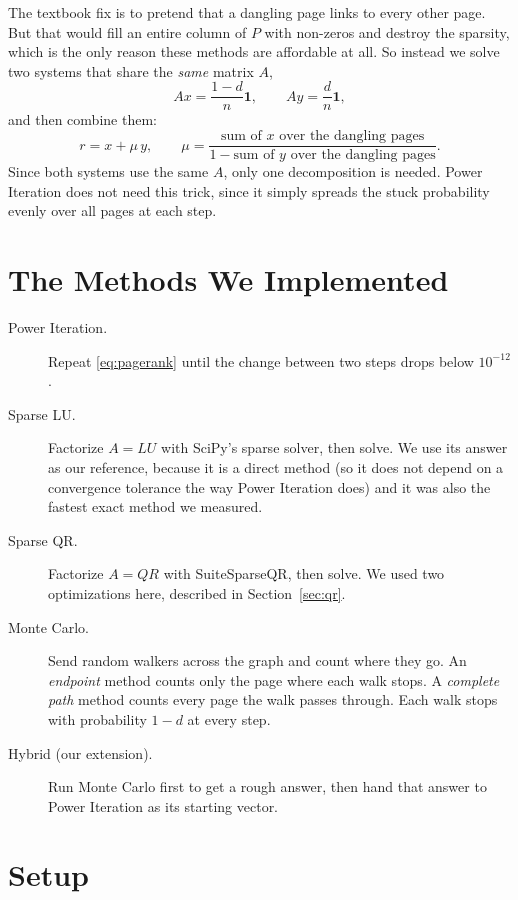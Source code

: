 \documentclass[11pt,a4paper]{article}
\begin{document}
The textbook fix is to pretend that a dangling page links to every other page. But
that would fill an entire column of $P$ with non-zeros and destroy the sparsity, which
is the only reason these methods are affordable at all. So instead we solve two
systems that share the \emph{same} matrix $A$,
\[
  A x = \frac{1-d}{n}\mathbf{1},
  \qquad
  A y = \frac{d}{n}\mathbf{1},
\]
and then combine them:
\begin{equation}
  r = x + \mu\, y,
  \qquad
  \mu = \frac{\text{sum of } x \text{ over the dangling pages}}
             {1 - \text{sum of } y \text{ over the dangling pages}}.
  \label{eq:dangling}
\end{equation}
Since both systems use the same $A$, only one decomposition is needed. Power Iteration
does not need this trick, since it simply spreads the stuck probability evenly over all
pages at each step.

\section{The Methods We Implemented}

\begin{description}
  \item[Power Iteration.] Repeat \eqref{eq:pagerank} until the change between two
    steps drops below $10^{-12}$.
  \item[Sparse LU.] Factorize $A = LU$ with SciPy's sparse solver, then solve. We use
    its answer as our reference, because it is a direct method (so it does not depend
    on a convergence tolerance the way Power Iteration does) and it was also the
    fastest exact method we measured.
  \item[Sparse QR.] Factorize $A = QR$ with SuiteSparseQR, then solve. We used two
    optimizations here, described in Section~\ref{sec:qr}.
  \item[Monte Carlo.] Send random walkers across the graph and count where they go.
    An \emph{endpoint} method counts only the page where each walk stops. A
    \emph{complete path} method counts every page the walk passes through. Each walk
    stops with probability $1 - d$ at every step.
  \item[Hybrid (our extension).] Run Monte Carlo first to get a rough answer, then
    hand that answer to Power Iteration as its starting vector.
\end{description}

\section{Setup}
\end{document}
